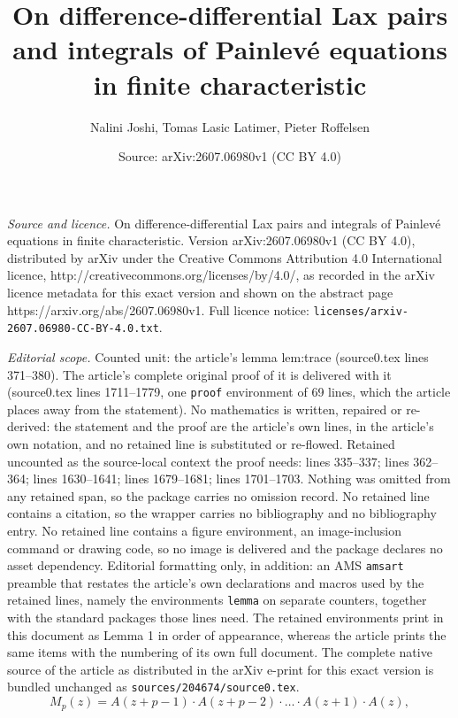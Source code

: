 \documentclass[10pt,a4paper]{amsart}
\title{On difference-differential Lax pairs and integrals of Painlev\'e equations in finite characteristic}
\author{Nalini Joshi, Tomas Lasic Latimer, Pieter Roffelsen}
\date{Source: arXiv:2607.06980v1 (CC BY 4.0)}
\begin{document}
\maketitle

\noindent\emph{Source and licence.} On difference-differential Lax pairs and integrals of Painlev\'e equations in finite characteristic. Version arXiv:2607.06980v1 (CC BY 4.0), distributed by arXiv under the Creative Commons Attribution 4.0 International licence, http://creativecommons.org/licenses/by/4.0/, as recorded in the arXiv licence metadata for this exact version and shown on the abstract page https://arxiv.org/abs/2607.06980v1. Full licence notice: \texttt{licenses/arxiv-2607.06980-CC-BY-4.0.txt}.\par\smallskip

\noindent\textit{Editorial scope.} Counted unit: the article's lemma lem:trace (source0.tex lines 371--380). The article's complete original proof of it is delivered with it (source0.tex lines 1711--1779, one \texttt{proof} environment of 69 lines, which the article places away from the statement). No mathematics is written, repaired or re-derived: the statement and the proof are the article's own lines, in the article's own notation, and no retained line is substituted or re-flowed.  Retained uncounted as the source-local context the proof needs: lines 335--337; lines 362--364; lines 1630--1641; lines 1679--1681; lines 1701--1703.  Nothing was omitted from any retained span, so the package carries no omission record.  No retained line contains a citation, so the wrapper carries no bibliography and no bibliography entry.  No retained line contains a figure environment, an image-inclusion command or drawing code, so no image is delivered and the package declares no asset dependency.  Editorial formatting only, in addition: an AMS \texttt{amsart} preamble that restates the article's own declarations and macros used by the retained lines, namely the environments \texttt{lemma} on separate counters, together with the standard packages those lines need.  The retained environments print in this document as Lemma 1 in order of appearance, whereas the article prints the same items with the numbering of its own full document.  The complete native source of the article as distributed in the arXiv e-print for this exact version is bundled unchanged as \texttt{sources/204674/source0.tex}.
\begin{equation}\label{eq:Mp def}
    M_p(z)=A(z+p-1)\cdot A(z+p-2)\cdot\ldots\cdot A(z+1)\cdot A(z),
\end{equation}
\end{document}
